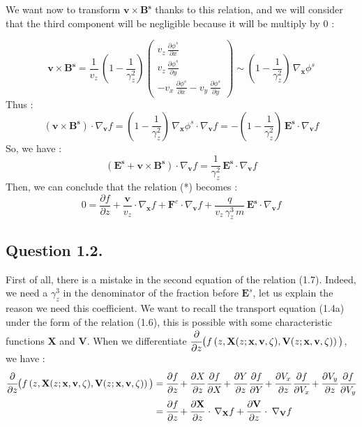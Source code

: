 \documentclass[10pt]{article}
\newcommand{\D}{{\partial}}
\begin{document}
We want now to transform $\mathbf{v} \times \mathbf{B^s}$ thanks to this relation, and we will consider that the third component will be negligible because it will be multiply by 0 :

$$\mathbf{v} \times \mathbf{B^s} = \frac{1}{v_z}\,\left(1 - \frac{1}{\gamma_{z}^{2}}\right) \left( \begin{array}{c}
v_z\,\frac{\D \phi^{s}}{\D x} \\
v_z\,\frac{\D \phi^{s}}{\D y} \\
- v_x\,\frac{\D \phi^{s}}{\D x} - v_y\,\frac{\D \phi^{s}}{\D y}
\end{array} \right) \sim \left(1 - \frac{1}{\gamma_{z}^{2}}\right)\,\nabla_{\mathbf{x}}\phi^s$$
Thus :
$$ \left(\mathbf{v}\times\mathbf{B^s}\right) \cdot \nabla_{\mathbf{v}}f = \left(1 - \frac{1}{\gamma_{z}^{2}}\right)\,\nabla_{\mathbf{x}}\phi^s \cdot \nabla_{\mathbf{v}}f = - \left(1 - \frac{1}{\gamma_{z}^{2}}\right)\,\mathbf{E^s} \cdot \nabla_{\mathbf{v}}f$$
So, we have :
$$ (\mathbf{E^s}+\mathbf{v}\times\mathbf{B^s}) \cdot \nabla_{\mathbf{v}}f = \frac{1}{\gamma_{z}^{2}}\,\mathbf{E^s} \cdot \nabla_{\mathbf{v}}f$$
Then, we can conclude that the relation (*) becomes :
$$\boxed{ 0 = \frac{\D f}{\D z} + \frac{\mathbf{v}}{v_z} \cdot \nabla_{\mathbf{x}}f + \mathbf{F}^{e} \cdot \nabla_{\mathbf{v}}f + \frac{q}{v_z\,\gamma_{z}^{3}\,m}\,\mathbf{E^s} \cdot \nabla_{\mathbf{v}}f } $$

\newpage


\subsection{Question 1.2.}


First of all, there is a mistake in the second equation of the relation (1.7). Indeed, we need a $\gamma_{z}^3$ in the denominator of the fraction before $\mathbf{E}^s$, let us explain the reason we need this coefficient. We want to recall the transport equation (1.4a) under the form of the relation (1.6), this is possible with some characteristic functions $\mathbf{X}$ and $\mathbf{V}$.
When we differentiate $\cfrac{\D}{\D z}\big( f\left(z,\mathbf{X}(z; \mathbf{x},\mathbf{v},\zeta),\mathbf{V}(z; \mathbf{x},\mathbf{v},\zeta)\right) \big)$, we have :
\begin{align*}
\cfrac{\D}{\D z}\big( f\left(z,\mathbf{X}(z; \mathbf{x},\mathbf{v},\zeta),\mathbf{V}(z; \mathbf{x},\mathbf{v},\zeta)\right) \big) &= \cfrac{\D f}{\D z} + \cfrac{\D X}{\D z}\,\cfrac{\D f}{\D X} + \cfrac{\D Y}{\D z}\,\cfrac{\D f}{\D Y} + \cfrac{\D V_x}{\D z}\,\cfrac{\D f}{\D V_x} + \cfrac{\D V_y}{\D z}\,\cfrac{\D f}{\D V_y} \\
&= \cfrac{\D f}{\D z} + \cfrac{\D \mathbf{X}}{\D z}\,\cdot \,\nabla_{\mathbf{X}} f + \cfrac{\D \mathbf{V}}{\D z}\,\cdot \;\nabla_{\mathbf{V}} f
\end{align*}
\end{document}
